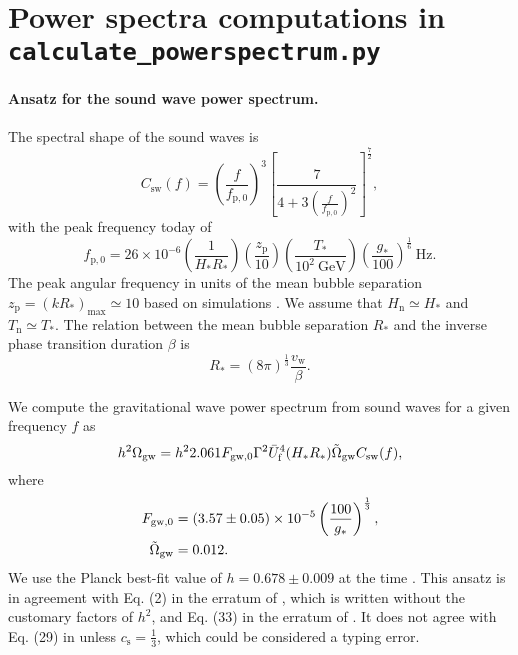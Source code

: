 \documentclass[10pt]{article}
\begin{document}
\section{Power spectra computations in \texttt{calculate\_powerspectrum.py}}

\paragraph{Ansatz for the sound wave power spectrum.}
The spectral shape of the sound waves is \cite{lisa19, shape17}
\begin{equation}
    C_\mathrm{sw}(f) = \left(\frac{f}{f_{\mathrm{p},0}}\right)^3 \left[\frac{7}{4+3\left(\frac{f}{f_{\mathrm{p},0}}\right)^2}\right]^{\frac{7}{2}},
\end{equation}
with the peak frequency today of
\begin{equation}
    f_{\mathrm{p},0} = 26\times10^{-6} \left(\frac{1}{H_* R_*}\right) \left(\frac{z_\mathrm{p}}{10}\right) \left(\frac{T_*}{10^2 \ \mathrm{GeV}}\right) \left(\frac{g_*}{100}\right)^{\frac{1}{6}} \ \mathrm{Hz}.
\end{equation}
The peak angular frequency in units of the mean bubble separation $z_{\mathrm{p}}=(kR_*)_{\mathrm{max}}\simeq10$ based on simulations \cite{lisa19, shape17}. We assume that $H_\mathrm{n}\simeq H_*$ and $T_\mathrm{n}\simeq T_*$. The relation between the mean bubble separation $R_*$ and the inverse phase transition duration $\beta$ is \cite{shape17}
\begin{equation}
    R_* = (8\pi)^{\frac{1}{3}} \frac{v_\mathrm{w}}{\beta}.
\end{equation}

We compute the gravitational wave power spectrum from sound waves for a given frequency $f$ as \cite{shape17}
\begin{equation}
    h^2\Omega_\mathrm{gw} = h^2 2.061 F_{\mathrm{gw},0} \Gamma^2 \Bar{U}_\mathrm{f}^4 (H_* R_*) \Tilde{\Omega}_\mathrm{gw} C_\mathrm{sw}(f),
\end{equation}
where
\begin{align}
    F_{\mathrm{gw},0} &= (3.57\pm0.05)\times10^{-5} \left(\frac{100}{g_*}\right)^{\frac{1}{3}}, \\
    \Tilde{\Omega}_\mathrm{gw}&=0.012.
\end{align}
We use the Planck best-fit value of $h=0.678\pm0.009$ at the time \cite{shape17}. This ansatz is in agreement with Eq. (2) in the erratum of \cite{shape17}, which is written without the customary factors of $h^2$, and Eq. (33) in the erratum of \cite{weir18}.
It does not agree with Eq. (29) in \cite{lisa19} unless $c_\mathrm{s}=\frac{1}{3}$, which could be considered a typing error.
\end{document}
